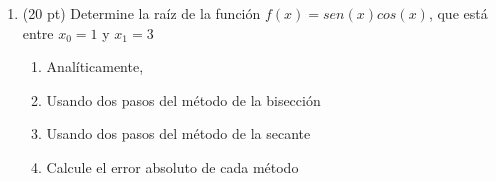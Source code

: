 \documentclass[11pt]{article}
\begin{document}
\begin{enumerate}
\newpage

\item (20 pt) Determine la ra\'iz de la funci\'on $f(x)=sen(x)cos(x)$, 
que est\'a entre $x_0=1$ y $x_1=3$

\begin{enumerate}
\item Anal\'iticamente,
\item Usando dos pasos del m\'etodo de la bisecci\'on
\item Usando dos pasos del m\'etodo de la secante 
\item Calcule el error absoluto de cada m\'etodo
\end{enumerate}





 \end{enumerate}
\end{document}
